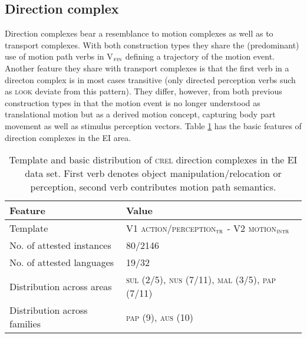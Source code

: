 \subsection{Direction complex} \label{sec:direction}
Direction complexes bear a resemblance to motion complexes as well as to transport complexes. With both construction types they share the (predominant) use of motion path verbs in V$_{\textsc{fin}}$ defining a trajectory of the motion event. Another feature they share with transport complexes is that the first verb in a directon complex is in most cases transitive (only directed perception verbs such as \textsc{look} deviate from this pattern). They differ, however, from both previous construction types in that the motion event is no longer understood as translational motion but as a derived motion concept, capturing body part movement as well as stimulus perception vectors. Table \ref{table:basiccreldir} has the basic features of direction complexes in the EI area.

\begin{table}


\begin{tabular}{ll}
\lsptoprule
Feature&Value\tabularnewline
\hline
Template&V1 \textsc{action/perception$_{\textsc{tr}}$} - V2 \textsc{motion$_\textsc{intr}$}\tabularnewline
No. of attested instances& 80/2146 \tabularnewline
No. of attested languages& 19/32 \tabularnewline
Distribution across areas& \textsc{sul} (2/5), \textsc{nus} (7/11), \textsc{mal} (3/5), \textsc{pap} (7/11) \tabularnewline
Distribution across families& \textsc{pap} (9), \textsc{aus} (10) \tabularnewline
\hline
\end{tabular}
\caption[Template and basic distribution of \textsc{crel} direction complexes]{Template and basic distribution of \textsc{crel} direction complexes in the EI data set. First verb denotes object manipulation/relocation or perception, second verb contributes motion path semantics.}
\label{table:basiccreldir}
\end{table}
 

